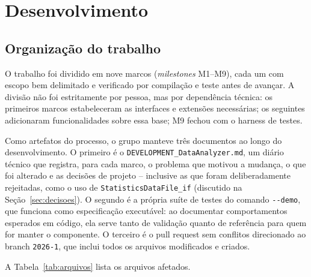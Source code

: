 \section{Desenvolvimento}

\subsection{Organização do trabalho}

O trabalho foi dividido em nove marcos (\textit{milestones} M1--M9), cada um com escopo bem delimitado e verificado por compilação e teste antes de avançar. A divisão não foi estritamente por pessoa, mas por dependência técnica: os primeiros marcos estabeleceram as interfaces e extensões necessárias; os seguintes adicionaram funcionalidades sobre essa base; M9 fechou com o harness de testes.

Como artefatos do processo, o grupo manteve três documentos ao longo do desenvolvimento. O primeiro é o \texttt{DEVELOPMENT\_DataAnalyzer.md}, um diário técnico que registra, para cada marco, o problema que motivou a mudança, o que foi alterado e as decisões de projeto -- inclusive as que foram deliberadamente rejeitadas, como o uso de \texttt{StatisticsDataFile\_if} (discutido na Seção~\ref{sec:decisoes}). O segundo é a própria suíte de testes do comando \texttt{-{}-demo}, que funciona como especificação executável: ao documentar comportamentos esperados em código, ela serve tanto de validação quanto de referência para quem for manter o componente. O terceiro é o pull request sem conflitos direcionado ao branch \texttt{2026-1}, que inclui todos os arquivos modificados e criados.

A Tabela~\ref{tab:arquivos} lista os arquivos afetados.

